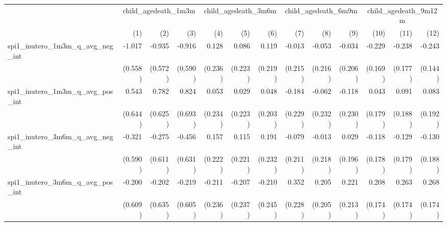 \begin{tabular}{lrrrrrrrrrrrr}
\toprule
                                            &  \multicolumn{3}{c}{child\_agedeath\_1m3m} &  \multicolumn{3}{c}{child\_agedeath\_3m6m} &  \multicolumn{3}{c}{child\_agedeath\_6m9m} & \multicolumn{3}{c}{child\_agedeath\_9m12m} \\ 
\cmidrule(lr){2-4} \cmidrule(lr){5-7} \cmidrule(lr){8-10} \cmidrule(lr){11-13} 
                                            &          (1) &          (2) &          (3) &          (4) &          (5) &          (6) &          (7) &          (8) &          (9) &         (10) &         (11) &         (12) \\ 
\midrule
spi1\_inutero\_1m3m\_q\_avg\_neg\_int       &       -1.017 &       -0.935 &       -0.916 &        0.128 &        0.086 &        0.119 &       -0.013 &       -0.053 &       -0.034 &       -0.229 &       -0.238 &       -0.243 \\ 
                                            &      (0.558) &      (0.572) &      (0.590) &      (0.236) &      (0.223) &      (0.219) &      (0.215) &      (0.216) &      (0.206) &      (0.169) &      (0.177) &      (0.144) \\ 
spi1\_inutero\_1m3m\_q\_avg\_pos\_int       &        0.543 &        0.782 &        0.824 &        0.053 &        0.029 &        0.048 &       -0.184 &       -0.062 &       -0.118 &        0.043 &        0.091 &        0.083 \\ 
                                            &      (0.644) &      (0.625) &      (0.693) &      (0.234) &      (0.223) &      (0.203) &      (0.229) &      (0.232) &      (0.230) &      (0.179) &      (0.188) &      (0.192) \\ 
spi1\_inutero\_3m6m\_q\_avg\_neg\_int       &       -0.321 &       -0.275 &       -0.456 &        0.157 &        0.115 &        0.191 &       -0.079 &       -0.013 &        0.029 &       -0.118 &       -0.129 &       -0.130 \\ 
                                            &      (0.590) &      (0.611) &      (0.631) &      (0.222) &      (0.221) &      (0.232) &      (0.211) &      (0.218) &      (0.196) &      (0.178) &      (0.179) &      (0.188) \\ 
spi1\_inutero\_3m6m\_q\_avg\_pos\_int       &       -0.200 &       -0.202 &       -0.219 &       -0.211 &       -0.207 &       -0.210 &        0.352 &        0.205 &        0.221 &        0.208 &        0.263 &        0.268 \\ 
                                            &      (0.609) &      (0.635) &      (0.605) &      (0.236) &      (0.237) &      (0.245) &      (0.228) &      (0.205) &      (0.213) &      (0.174) &      (0.174) &      (0.174) \\ 

\end{tabular}
